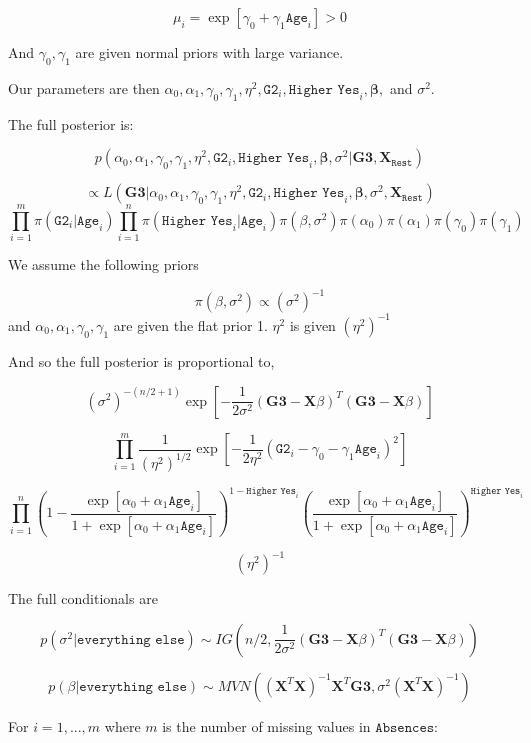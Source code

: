 \documentclass[11pt]{article}
\begin{document}
$$\mu_i=\exp[\gamma_0+\gamma_1\texttt{Age}_i]  > 0$$

And $\gamma_0, \gamma_1$ are given normal priors with large variance.

Our parameters are then $\alpha_0, \alpha_1, \gamma_0, \gamma_1, \eta^2, \texttt{G2}_i, \texttt{Higher Yes}_i, \mathbf{\beta},$ and $\sigma^2$.

The full posterior is:

$$p(\alpha_0, \alpha_1, \gamma_0, \gamma_1, \eta^2, \texttt{G2}_i, \texttt{Higher Yes}_i, \mathbf{\beta},\sigma^2|\mathbf{G3}, \mathbf{X}_{\texttt{Rest}})$$

$$\propto L(\mathbf{G3}|\alpha_0, \alpha_1, \gamma_0, \gamma_1, \eta^2, \texttt{G2}_i, \texttt{Higher Yes}_i, \mathbf{\beta},\sigma^2, \mathbf{X}_{\texttt{Rest}})$$
$$\prod_{i=1}^{m}\pi(\texttt{G2}_i|\texttt{Age}_i)\prod_{i=1}^{n}\pi(\texttt{Higher Yes}_i|\texttt{Age}_i)\pi(\beta, \sigma^2)\pi(\alpha_0)\pi(\alpha_1)\pi(\gamma_0)\pi(\gamma_1)$$


We assume the following priors

$$\pi(\beta, \sigma^2)\propto (\sigma^2)^{-1}$$ and $\alpha_0, \alpha_1, \gamma_0, \gamma_1$ are given the flat prior 1. $\eta^2$ is given $(\eta^2)^{-1}$

And so the full posterior is proportional to,

$$(\sigma^2)^{-(n/2+1)}\exp[-\frac{1}{2\sigma^2}(\mathbf{G3}-\mathbf{X}\beta)^T(\mathbf{G3}-\mathbf{X}\beta)]$$

$$\prod_{i=1}^m \frac{1}{(\eta^2)^{1/2}} \exp \left[-\frac{1}{2\eta^2} (\texttt{G2}_i - \gamma_0 - \gamma_1 \texttt{Age}_i)^2 \right]$$

$$\prod_{i=1}^{n}(1-\frac{\exp[\alpha_0+\alpha_1\texttt{Age}_i]}{1+\exp[\alpha_0+\alpha_1\texttt{Age}_i]})^{1-\texttt{Higher Yes}_i}(\frac{\exp[\alpha_0+\alpha_1\texttt{Age}_i]}{1+\exp[\alpha_0+\alpha_1\texttt{Age}_i]})^{\texttt{Higher Yes}_i}$$

$$(\eta^2)^{-1}$$

The full conditionals are

$$p(\sigma^2|\texttt{everything else}) \sim IG(n/2,\frac{1}{2\sigma^2}(\mathbf{G3}-\mathbf{X}\beta)^T(\mathbf{G3}-\mathbf{X}\beta))$$

$$p(\beta|\texttt{everything else}) \sim MVN((\mathbf{X}^T\mathbf{X})^{-1}\mathbf{X}^T\mathbf{G3}, \sigma^2(\mathbf{X}^T\mathbf{X})^{-1})$$

For $i=1,...,m$ where $m$ is the number of missing values in $\texttt{Absences}$:
\end{document}
